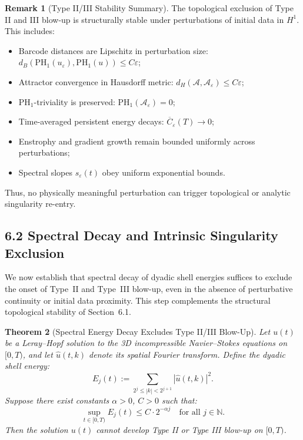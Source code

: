 \documentclass[11pt]{article}
\newtheorem{theorem}{Theorem}[section]
\theoremstyle{definition}
\newtheorem{remark}[theorem]{Remark}
\begin{document}
\begin{remark}[Type II/III Stability Summary]
The topological exclusion of Type II and III blow-up is structurally stable under perturbations of initial data in $H^1$. This includes:
\begin{itemize}
    \item Barcode distances are Lipschitz in perturbation size: $d_B(\mathrm{PH}_1(u_\varepsilon), \mathrm{PH}_1(u)) \le C \varepsilon$;
    \item Attractor convergence in Hausdorff metric: $d_H(\mathcal{A}, \mathcal{A}_\varepsilon) \le C \varepsilon$;
    \item PH$_1$-triviality is preserved: $\mathrm{PH}_1(\mathcal{A}_\varepsilon) = 0$;
    \item Time-averaged persistent energy decays: $\overline{C}_\varepsilon(T) \to 0$;
    \item Enstrophy and gradient growth remain bounded uniformly across perturbations;
    \item Spectral slopes $s_\varepsilon(t)$ obey uniform exponential bounds.
\end{itemize}
Thus, no physically meaningful perturbation can trigger topological or analytic singularity re-entry.
\end{remark}

\subsection{6.2 Spectral Decay and Intrinsic Singularity Exclusion}

We now establish that spectral decay of dyadic shell energies suffices to exclude the onset of Type~II and Type~III blow-up, even in the absence of perturbative continuity or initial data proximity. This step complements the structural topological stability of Section~6.1.

\begin{theorem}[Spectral Energy Decay Excludes Type II/III Blow-Up]
Let \( u(t) \) be a Leray--Hopf solution to the 3D incompressible Navier--Stokes equations on \( [0,T) \), and let \( \hat{u}(t,k) \) denote its spatial Fourier transform. Define the dyadic shell energy:
\[
E_j(t) := \sum_{2^j \le |k| < 2^{j+1}} |\hat{u}(t,k)|^2.
\]
Suppose there exist constants \( \alpha > 0 \), \( C > 0 \) such that:
\[
\sup_{t \in [0,T)} E_j(t) \le C \cdot 2^{-\alpha j} \quad \text{for all } j \in \mathbb{N}.
\]
Then the solution \( u(t) \) cannot develop Type II or Type III blow-up on \( [0,T) \).
\end{theorem}
\end{document}
